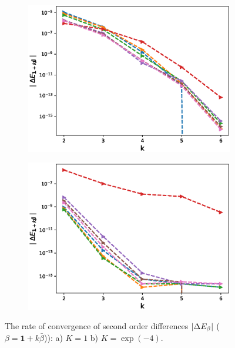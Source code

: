 \documentclass[11pt]{article}
\begin{document}
\begin{figure}[h!]
\centering
\begin{subfigure}{.5\textwidth}
\centering
\includegraphics[width=1\linewidth]{./figures/mixed_diff_second_way/H_007/N_8/mixed_difference_order2_rbergomi_8steps_H_007_K_1.eps}
\caption{}
\label{fig:sub3}
\end{subfigure}%
\begin{subfigure}{.5\textwidth}
\centering
\includegraphics[width=1\linewidth]{./figures/mixed_diff_second_way/H_007/N_8/mixed_difference_order2_rbergomi_8steps_H_007_K_exp__4.eps}
\caption{}
\label{fig:sub4}
\end{subfigure}

\caption{The rate of convergence of  second order differences $\left\lvert\Delta E_{\beta}\right\rvert$ ($\beta=\mathbf{1}+k \bar{\beta}$)): a) $K=1$ b)  $K=\operatorname{exp}(-4).$}
\label{fig:test2}
\end{figure}
\end{document}

